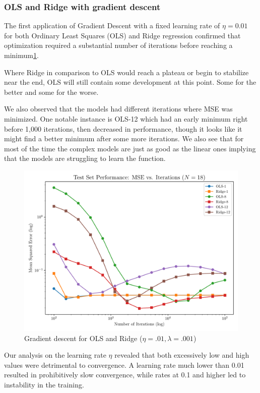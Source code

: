 \documentclass[twocolumn,aps]{revtex4}
\begin{document}
\subsubsection{OLS and Ridge with gradient descent}
The first application of Gradient Descent with a fixed learning rate of $\eta=0.01$ for both Ordinary Least Squares (OLS) and Ridge regression confirmed that optimization required a substantial number of iterations before reaching a minimum\ref{fig:DescOLSRidge}.

Where Ridge in comparison to OLS would reach a plateau or begin to stabilize near the end, OLS will still contain some development at this point. 
Some for the better and some for the worse.

We also observed that the models had different iterations where MSE was minimized.
One notable instance is OLS-12 which had an early minimum right before 1,000 iterations, then decreased in performance, though it looks like it might find a better minimum after some more iterations.
We also see that for most of the time the complex models are just as good as the linear ones implying that the models are struggling to learn the function.


\begin{figure}[h]
    \centering
    \includegraphics[width=.95 \linewidth]{Figures/Gradient_Comparison_OLS_Ridge_18.pdf}
    \caption{Gradient descent for OLS and Ridge ($\eta=.01, \lambda=.001$)}
    \label{fig:DescOLSRidge}
\end{figure}
Our analysis on the learning rate $\eta$ revealed that both excessively low and high values were detrimental to convergence.
A learning rate much lower than 0.01 resulted in prohibitively slow convergence, while rates at 0.1 and higher led to instability in the training.
\end{document}
